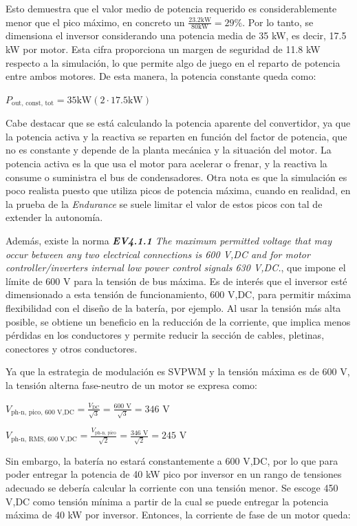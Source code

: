 Esto demuestra que el valor medio de potencia requerido es considerablemente menor que el pico máximo, en concreto un \(\frac{23.2 \text{kW}}{80 \text{kW}} = 29\%\). Por lo tanto, se dimensiona el inversor considerando una potencia media de 35 kW, es decir, 17.5 kW por motor. Esta cifra proporciona un margen de seguridad de 11.8 kW respecto a la simulación, lo que permite algo de juego en el reparto de potencia entre ambos motores. De esta manera, la potencia constante queda como:

\(P_{\text{out, const, tot}} = 35 \text{kW} (2 \cdot 17.5 \text{kW})\)

Cabe destacar que se está calculando la potencia aparente del convertidor, ya que la potencia activa y la reactiva se reparten en función del factor de potencia, que no es constante y depende de la planta mecánica y la situación del motor. La potencia activa es la que usa el motor para acelerar o frenar, y la reactiva la consume o suministra el bus de condensadores. Otra nota es que la simulación es poco realista puesto que utiliza picos de potencia máxima, cuando en realidad, en la prueba de la \textit{Endurance} se suele limitar el valor de estos picos con tal de extender la autonomía.

Además, existe la norma \textit{\textbf{EV4.1.1} The maximum permitted voltage that may occur between any two electrical connections is 600 V,DC and for motor controller/inverters internal low power control signals 630 V,DC.}, que impone el límite de 600 V para la tensión de bus máxima. Es de interés que el inversor esté dimensionado a esta tensión de funcionamiento, 600 V,DC, para permitir máxima flexibilidad con el diseño de la batería, por ejemplo. Al usar la tensión más alta posible, se obtiene un beneficio en la reducción de la corriente, que implica menos pérdidas en los conductores y permite reducir la sección de cables, pletinas, conectores y otros conductores.

Ya que la estrategia de modulación es SVPWM y la tensión máxima es de 600 V, la tensión alterna fase-neutro de un motor se expresa como:

\(V_{\text{ph-n, pico, 600 V,DC}} = \frac{V_{\text{DC}}}{\sqrt{3}} = \frac{600 \text{ V}}{\sqrt{3}} = 346 \text{ V}\)

\(V_{\text{ph-n, RMS, 600 V,DC}} = \frac{V_{\text{ph-n, pico}}}{\sqrt{2}} = \frac{346 \text{ V}}{\sqrt{2}} = 245 \text{ V}\)

Sin embargo, la batería no estará constantemente a 600 V,DC, por lo que para poder entregar la potencia de 40 kW pico por inversor en un rango de tensiones adecuado se debería calcular la corriente con una tensión menor. Se escoge 450 V,DC como tensión mínima a partir de la cual se puede entregar la potencia máxima de 40 kW por inversor. Entonces, la corriente de fase de un motor queda:

